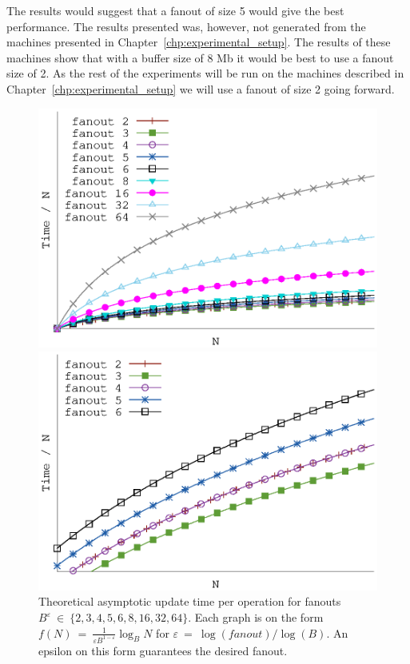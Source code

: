 \documentclass[twoside,11pt,openright]{report}
\def \epsilon {\varepsilon}
\begin{document}
The results would suggest that a fanout of size 5 would give the best performance.
The results presented was, however, not generated from the machines presented in Chapter~\ref{chp:experimental_setup}. The results of these machines show that with a buffer size of 8 Mb it would be best to use a fanout size of 2. As the rest of the experiments will be run on the machines described in Chapter~\ref{chp:experimental_setup} we will use a fanout of size 2 going forward.

\begin{figure}[h]
\centering
\begin{minipage}[t]{0.48\columnwidth}
  \centering
  \includegraphics[width=\linewidth]{../plots/gerth_update_epsilon/gerth_epsilon}
  \caption{Theoretical asymptotic update time per operation for fanouts $B^\epsilon~\in~\{2, 3, 4, 5, 6, 8, 16, 32, 64\}$. Each graph is on the form $f(N)~=~\frac{1}{\epsilon B^{1-\epsilon}} \log_B N$ for $\epsilon~=~\log(fanout) / \log(B)$. An epsilon on this form guarantees the desired fanout.}
  \label{fig:gerth_fanout_experiment}
\end{minipage}
\hfill
\begin{minipage}[t]{0.48\columnwidth}
  \centering
  \includegraphics[width=\linewidth]{../plots/gerth_update_epsilon/gerth_epsilon_zoom}

\end{minipage}
\end{figure}
\end{document}
